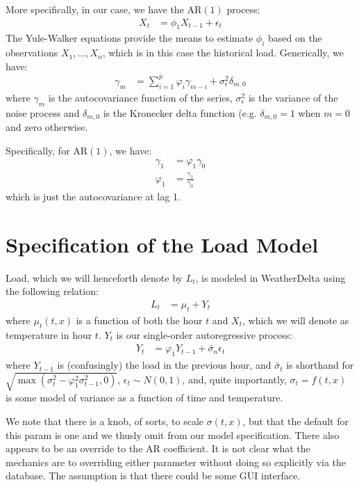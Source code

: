 \documentclass[11pt, a4paper]{article}
\begin{document}
More specifically, in our case, we have the AR$(1)$ process:
\begin{align*}
  X_t &= \phi_1 X_{t-1} + \epsilon_t
\end{align*}
The Yule-Walker equations provide the means to estimate $\phi_i$ based
on the observations $X_1, \dots, X_n$, which is in this case the
historical load.  Generically, we have:
\begin{align*}
  \gamma_m &= \sum_{i=1}^p \varphi_i \gamma_{m-i} + \sigma_{\epsilon}^2
             \delta_{m,0}
\end{align*}
where $\gamma_m$ is the autocovariance function of the series,
$\sigma_{\epsilon}^2$ is the variance of the noise process and
$\delta_{m,0}$ is the Kronecker delta function (e.g. $\delta_{m,0} =
1$ when $m=0$ and zero otherwise.

Specifically, for AR$(1)$, we have:
\begin{align*}
  \gamma_1 &= \varphi_1 \gamma_0 \\
  \varphi_1 &= \frac{\gamma_1}{\gamma_0}
\end{align*}
which is just the autocovariance at lag 1.

\section{Specification of the Load Model}

Load, which we will henceforth denote by $L_t$, is modeled in
WeatherDelta using the following relation:
\begin{align*}
  L_t &= \mu_t + Y_t
\end{align*}
where $\mu_t(t, x)$ is a function of both the hour $t$ and $X_t$, which we
will denote as temperature in hour $t$.  $Y_t$ is our single-order
autoregressive process:
\begin{align*}
  Y_t &= \varphi_1 Y_{t-1} + \tilde{\sigma_n} \epsilon_t
\end{align*}
where $Y_{t-1}$ is (confusingly) the load in the previous hour, and
$\tilde{\sigma_t}$ is shorthand for
$\sqrt{\max{(\sigma_t^2 - \varphi_1^2 \sigma_{t-1}^2, 0)}}$,
$\epsilon_t \sim N(0,1)$, and, quite importantly, $\sigma_t = f(t, x)$
is some model of variance as a function of time and temperature.  

We note that there is a knob, of sorts, to scale $\sigma(t,x)$, but that
the default for this param is one and we thusly omit from our model
specification.  There also appears to be an override to the AR
coefficient.  It is not clear what the mechanics are to overriding
either parameter without doing so explicitly via the database.  The
assumption is that there could be some GUI interface.
\end{document}
